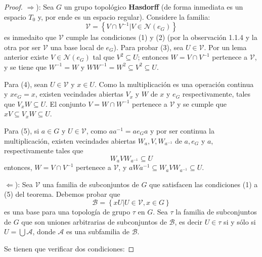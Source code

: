 \documentclass[12pt]{report}
\theoremstyle{largebreak}
\newcommand{\N}[1]{\ensuremath{\mathscr{N}(#1)}}
\begin{document}
    \begin{proof}
        $\Rightarrow$): Sea $G$ un grupo topológico \textbf{Hasdorff} (de forma inmediata es un espacio $T_0$ y, por ende es un espacio regular). Considere la familia:
        \begin{equation*}
            \mathcal{V}=\left\{V\cap V^{-1}\big|V\in\N{e_G} \right\}
        \end{equation*}
        es inmedaito que $\mathcal{V}$ cumple las condiciones (1) y (2) (por la observación 1.1.4 y la otra por ser $\mathcal{V}$ una base local de $e_G$). Para probar (3), sea $U\in\mathcal{V}$. Por un lema anterior existe $V\in\N{e_G}$ tal que $V^2\subseteq U$; entonces $W=V\cap V^{-1}$ pertenece a $\mathcal{V}$, y se tiene que $W^{-1}=W$ y $WW^{-1}=W^2\subseteq V^2\subseteq U$.

        Para (4), sean $U\in\mathcal{V}$ y $x\in U$. Como la multiplicación es una operación continua y $xe_G=x$, existen vecindades abiertas $V_x$ y $W$ de $x$ y $e_G$ respectivamente, tales que $V_xW\subseteq U$. El conjunto $V=W\cap W^{-1}$ pertenece a $\mathcal{V}$ y se cumple que $xV\subseteq V_xW\subseteq U$.

        Para (5), si $a\in G$ y $U\in\mathcal{V}$, como $aa^{-1}=ae_Ga$ y por ser continua la multiplicación, existen vecindades abiertas $W_a,V,W_{a^{-1}}$ de $a,e_G$ y $a$, respectivamente tales que
        \begin{equation*}
            W_aVW_{a^{-1}}\subseteq U
        \end{equation*}
        entonces, $W=V\cap V^{-1}$ pertenece a $\mathcal{V}$, y $aWa^{-1}\subseteq W_aVW_{a^{-1}}\subseteq U$.

        $\Leftarrow$): Sea $\mathcal{V}$ una familia de subconjuntos de $G$ que satisfacen las condiciones (1) a (5) del teorema. Debemos probar que
        \begin{equation*}
            \mathcal{B}=\left\{xU\big|U\in\mathcal{V}, x\in G \right\}
        \end{equation*}
        es una base para una topología de grupo $\tau$ en $G$. Sea $\tau$ la familia de subconjuntos de $G$ que son uniones arbitrarias de subconjuntos de $\mathcal{B}$, es decir $U\in\tau$ si y sólo si $U=\bigcup\mathcal{A}$, donde $\mathcal{A}$ es una subfamilia de $\mathcal{B}$.

        Se tienen que verificar dos condiciones:


\end{proof}
\end{document}
